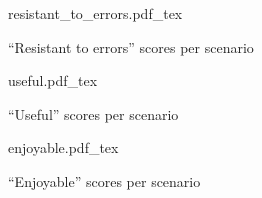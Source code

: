 \begin{figure}
    \centering
    \def\svgwidth{\columnwidth}
    {resistant_to_errors.pdf_tex}
    \caption{``Resistant to errors'' scores per scenario}
    \label{fig:preliminary_study_resistant_to_errors}
\end{figure}

\begin{figure}
    \centering
    \def\svgwidth{\columnwidth}
    {useful.pdf_tex}
    \caption{``Useful'' scores per scenario}
    \label{fig:preliminary_study_useful}
\end{figure}

\begin{figure}
    \centering
    \def\svgwidth{\columnwidth}
    {enjoyable.pdf_tex}
    \caption{``Enjoyable'' scores per scenario}
    \label{fig:preliminary_study_enjoyable}
\end{figure}

